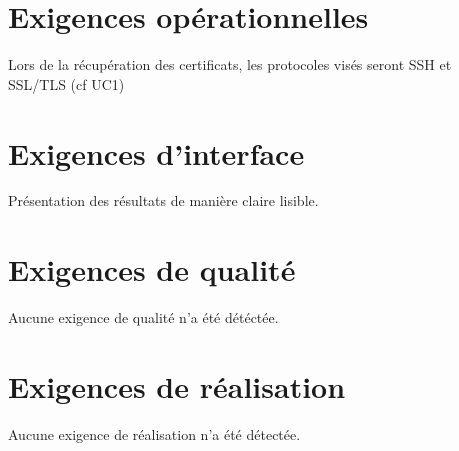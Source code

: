\documentclass[a4paper,11pt,french]{article}
\begin{document}
\section{Exigences opérationnelles}
Lors de la récupération des certificats, les protocoles visés seront SSH et SSL/TLS (cf UC1)

\section{Exigences d'interface}
Présentation des résultats de manière claire lisible.

\section{Exigences de qualité}
Aucune exigence de qualité n'a été détéctée.

\section{Exigences de réalisation}
Aucune exigence de réalisation n'a été détectée.
\end{document}
